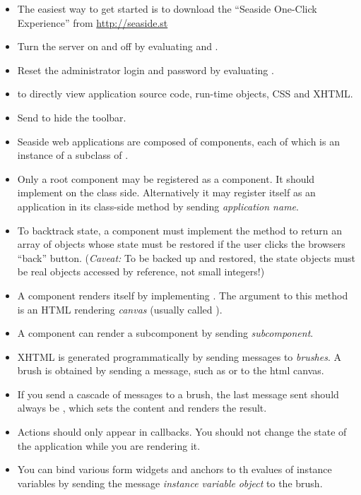 \documentclass[a4paper,10pt,twoside]{book}
\begin{document}
\begin{itemize}
  \item The easiest way to get started is to download the ``Seaside One-Click Experience'' from \url{http://seaside.st}
  \item Turn the server on and off by evaluating  and .
  \item Reset the administrator login and password by evaluating .
  \item {} to directly view application source code, run-time objects, CSS and XHTML.
  \item Send  to hide the toolbar.
  \item Seaside web applications are composed of components, each of which is an instance of a subclass of .
  \item Only a root component may be registered as a component. It should implement  on the class side. Alternatively it may register itself as an application in its class-side  method by sending  \emph{application name}.
  \item To backtrack state, a component must implement the  method to return an array of objects whose state must be restored if the user clicks the browsers ``back'' button. (\emph{Caveat:}  To be backed up and restored, the state objects must be real objects accessed by reference, not small integers!)
  \item A component renders itself by implementing .
  The argument to this method is an HTML rendering \emph{canvas} (usually called ).
  \item A component can render a subcomponent by sending  \emph{subcomponent}.
  \item XHTML is generated programmatically by sending messages to \emph{brushes}. A brush is obtained by sending a message, such as  or  to the html canvas.
  \item If you send a cascade of messages to a brush, the last message sent should always be , which sets the content and renders the result.
  \item Actions should only appear in callbacks.
You should not change the state of the application while you are rendering it.
  \item You can bind various form widgets and anchors to th evalues of instance variables by sending the message  \emph{instance variable}  \emph{object} to the brush.

\end{itemize}
\end{document}
